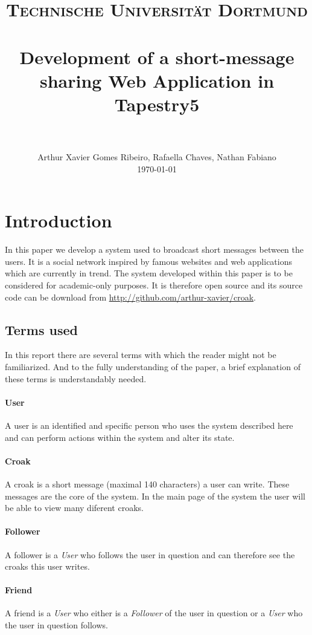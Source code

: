 \documentclass[paper=a4, fontsize=12pt]{scrartcl}
\title{
  \usefont{OT1}{bch}{b}{n}
  \normalfont \normalsize \textsc{Technische Universit\"at Dortmund} \\ [25pt]
  \horrule{0.5pt} \\[0.4cm]
  \huge Development of a short-message sharing Web Application in Tapestry5 \\
  \horrule{2pt} \\[0.5cm]
}
\author{
  \normalfont                 \normalsize
    Arthur Xavier Gomes Ribeiro, Rafaella Chaves, Nathan Fabiano\\[-3pt]    \normalsize
    \today
}
\date{}
\numberwithin{equation}{section}    %
\numberwithin{figure}{section}      %
\numberwithin{table}{section}        %
\begin{document}
\maketitle

\section{Introduction}
In this paper we develop a system used to broadcast short messages between the users.
It is a social network inspired by famous websites and web applications which are currently in trend.
The system developed within this paper is to be considered for academic-only purposes.
It is therefore open source and its source code can be download from \url{http://github.com/arthur-xavier/croak}.

\subsection{Terms used}
In this report there are several terms with which the reader might not be familiarized.
And to the fully understanding of the paper, a brief explanation of these terms is understandably needed.
\paragraph{User} A user is an identified and specific person who uses the system described here and can
perform actions within the system and alter its state.
\paragraph{Croak} A croak is a short message (maximal 140 characters) a user can write.
These messages are the core of the system. In the main page of the system the user will be able to
view many diferent croaks.
\paragraph{Follower} A follower is a \emph{User} who follows the user in question and can therefore
see the croaks this user writes.
\paragraph{Friend} A friend is a \emph{User} who either is a \emph{Follower} of the user in question or
a \emph{User} who the user in question follows.

\end{document}
